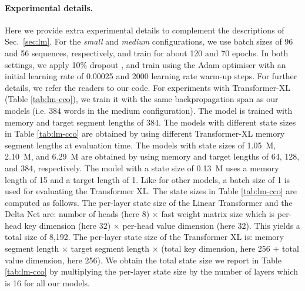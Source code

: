 \documentclass{article}
\theoremstyle{definition}
\begin{document}
\paragraph{Experimental details.}
Here we provide extra experimental details to complement
the descriptions of Sec.~\ref{sec:lm}.
For the \textit{small} and \textit{medium} configurations,
we use batch sizes of 96 and 56 sequences, respectively,
and train for about 120 and 70 epochs.
In both settings, we apply 10\% dropout \citep{hanson1990stochastic, srivastava2014dropout},
and train using the Adam optimiser \citep{kingma2014adam} with an initial learning rate of 0.00025 and 2000 learning rate warm-up steps.
For further details, we refer the readers to our code.
For experiments with Transformer-XL (Table \ref{tab:lm-cco}),
we train it with the same backpropagation span as our models
(i.e. $384$ words in the medium configuration).
The model is trained with memory and target segment lengths
of 384.
The models with different state sizes in Table \ref{tab:lm-cco} are obtained by using different Transformer-XL memory segment lengths at evaluation time.
The models with state sizes of 1.05~M, 2.10~M, and 6.29~M are obtained
by using memory and target lengths of 64, 128, and 384, respectively.
The model with a state size of 0.13~M uses a memory length of 15 and a target length of 1.
Like for other models, a batch size of 1 is used
for evaluating the Transformer XL.
The state sizes in Table \ref{tab:lm-cco} are computed
as follows.
The per-layer state size of the Linear Transformer and the Delta Net
are: number of heads (here 8) $\times$ fast weight matrix size which is per-head key dimension
(here 32) $\times$ per-head value dimension (here 32).
This yields a total size of 8,192.
The per-layer state size of the Transformer XL is:
memory segment length $\times$ target segment length 
$\times$ (total key dimension, here 256 $+$ total value dimension, here 256).
We obtain the total state size we report in Table \ref{tab:lm-cco} by multiplying the 
per-layer state size by the number of layers which is 16 for all our models.



\end{document}
